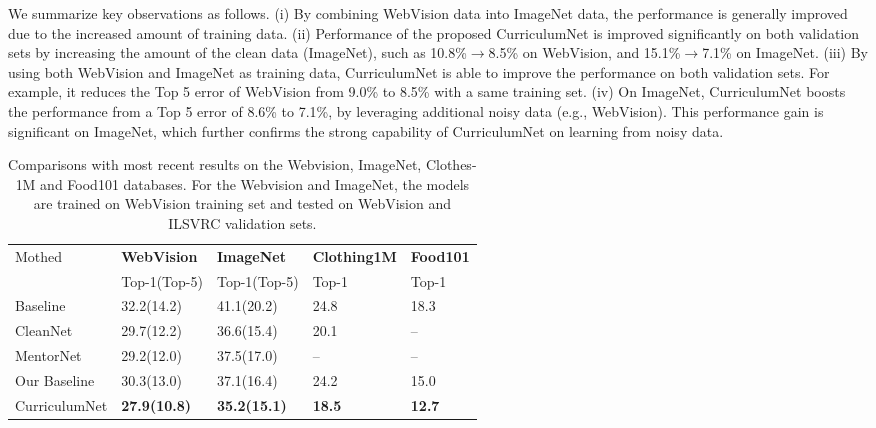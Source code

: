 \documentclass[runningheads]{llncs}
\begin{document}
We summarize key observations as follows. (i) By combining WebVision data into ImageNet data, the performance is generally improved due to the increased amount of training data. (ii) Performance of the proposed CurriculumNet is improved significantly on both validation sets by increasing the amount of the clean data (ImageNet), such as 10.8\%$\rightarrow$8.5\% on WebVision, and 15.1\%$\rightarrow$7.1\% on ImageNet. (iii) By using both WebVision and ImageNet as training data, CurriculumNet is able to improve the performance on both validation sets. For example, it reduces the Top 5 error of WebVision from 9.0\% to 8.5\% with a same training set. (iv) On ImageNet, CurriculumNet boosts the performance from a Top 5 error of 8.6\% to 7.1\%, by leveraging additional noisy data (e.g., WebVision). This performance gain is significant on ImageNet, which further confirms the strong capability of CurriculumNet on learning from noisy data.
\begin{table}[tp]
\begin{center}
\caption{Comparisons with most recent results on the Webvision, ImageNet, Clothes-1M and Food101 databases. For the Webvision and ImageNet, the models are trained on WebVision training set and tested on WebVision and ILSVRC validation sets.}
\label{tbl:compar_test}
\vspace{-2mm}
\begin{tabular}{p{2.2cm}|p{2.4cm}<{\centering}|p{2.4cm}<{\centering}|p{2cm}<{\centering}|p{2cm}<{\centering}}
\hline
\multirow{2}{*}{Mothed}& \textbf{ WebVision}& \textbf{ImageNet}& \textbf{Clothing1M}& \textbf{Food101} \\ \cline{2-5}
&Top-1(Top-5)&Top-1(Top-5)&Top-1&Top-1 \\
\hline
Baseline\cite{Lee2017}& 32.2(14.2)& 41.1(20.2)&24.8&18.3 \\
\hline
CleanNet \cite{Lee2017} &29.7(12.2) & 36.6(15.4)&20.1 & -- \\
\hline
MentorNet \cite{jiang2017mentornet} & 29.2(12.0) &37.5(17.0) & -- & -- \\
\hline
\hline
Our Baseline &30.3(13.0) & 37.1(16.4)& 24.2& 15.0 \\
\hline
CurriculumNet & {\bf27.9(10.8) } &{\bf 35.2(15.1)} &{\bf 18.5}& {\bf 12.7} \\
\hline
\end{tabular}


\end{center}
\end{table}
\end{document}
